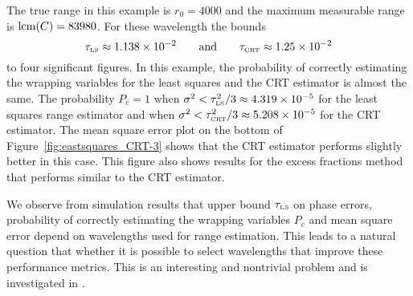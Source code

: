 The true range in this example is $r_0 = 4000$ and the maximum measurable range is $\operatorname{lcm}(C) = 83980$. 
For these wavelength the bounds 
\[
\tau_{\text{\tiny{LS}}} \approx 1.138 \times 10^{-2} \qquad \text{and} \qquad \tau_{\text{\tiny{CRT}}} \approx 1.25 \times 10^{-2}
\]
to four significant figures. In this example, the probability of correctly estimating the wrapping variables for the least squares and the CRT estimator is almost the same. The probability $P_c = 1$ when $\sigma^2 < \tau_{\text{\tiny{LS}}}^2/3 \approx 4.319\times 10^{-5}$ for the least squares range estimator and when $\sigma^2 < \tau_{\text{\tiny{CRT}}}^2/3 \approx 5.208 \times 10^{-5}$ for the CRT estimator. The mean square error plot on the bottom of  Figure~\ref{fig:eastsquares_CRT-3} shows that the CRT estimator performs slightly better in this case. This figure also shows results for the excess fractions method that performs similar to the CRT estimator.

We observe from simulation results that upper bound $\tau_{\text{\tiny{LS}}}$ on phase errors, probability of correctly estimating the wrapping variables $P_c$ and mean square error depend on wavelengths used for range estimation. This leads to a natural question that whether it is possible to select wavelengths that improve these performance metrics. This is an interesting and nontrivial problem and is investigated in .


